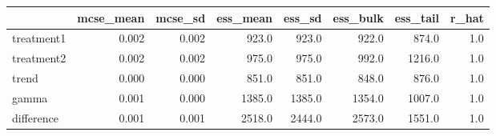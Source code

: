 \begin{tabular}{lrrrrrrr}
\toprule
{} &  mcse\_mean &  mcse\_sd &  ess\_mean &  ess\_sd &  ess\_bulk &  ess\_tail &  r\_hat \\
\midrule
treatment1 &      0.002 &    0.002 &     923.0 &   923.0 &     922.0 &     874.0 &    1.0 \\
treatment2 &      0.002 &    0.002 &     975.0 &   975.0 &     992.0 &    1216.0 &    1.0 \\
trend      &      0.000 &    0.000 &     851.0 &   851.0 &     848.0 &     876.0 &    1.0 \\
gamma      &      0.001 &    0.000 &    1385.0 &  1385.0 &    1354.0 &    1007.0 &    1.0 \\
difference &      0.001 &    0.001 &    2518.0 &  2444.0 &    2573.0 &    1551.0 &    1.0 \\
\bottomrule
\end{tabular}
